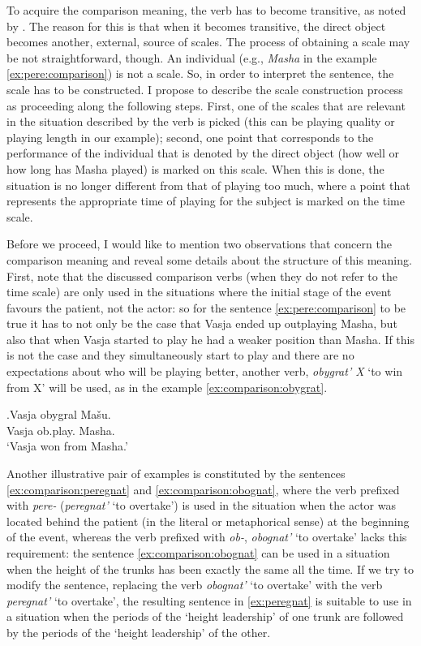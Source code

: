 To acquire the comparison meaning, the verb has to become transitive, as noted by \citet{Shvedova:82}. The reason for this is that when it becomes transitive, the direct object becomes another, external, source of scales. The process of obtaining a scale may be not straightforward, though. An individual (e.g., \textit{Masha} in the example \ref{ex:pere:comparison}) is not a scale. So, in order to interpret the sentence, the scale has to be constructed. I propose to describe the scale construction process as proceeding along the following steps. First, one of the scales that are relevant in the situation described by the verb is picked (this can be playing quality or playing length in our example); second, one point that corresponds to the performance of the individual that is denoted by the direct object (how well or how long has Masha played) is marked on this scale. When this is done, the situation is no longer different from that of playing too much, where a point that represents the appropriate time of playing for the subject is marked on the time scale.

Before we proceed, I would like to mention two observations that concern the comparison meaning and reveal some details about the structure of this meaning. First, note that the discussed comparison verbs (when they do not refer to the time scale) are only used in the situations where the initial stage of the event favours the patient, not the actor: so for the sentence \ref{ex:pere:comparison} to be true it has to not only be the case that Vasja ended up outplaying Masha, but also that when Vasja started to play he had a weaker position than Masha. If this is not the case and they simultaneously start to play and there are no expectations about who will be playing better, another verb, \textit{obygrat' X} `to win from X' will be used, as in the example \ref{ex:comparison:obygrat}. 

\exg.\label{ex:comparison:obygrat}Vasja obygral Ma\v{s}u.\\
Vasja ob.play. Masha.\\
\trans `Vasja won from Masha.'

Another illustrative pair of examples is constituted by the sentences \ref{ex:comparison:peregnat} and \ref{ex:comparison:obognat}, where the verb prefixed with \textit{pere-} (\textit{peregnat'} `to overtake') is used in the situation when the actor was located behind the patient (in the literal or metaphorical sense) at the beginning of the event, whereas the verb prefixed with {\textit{ob-},} \textit{obognat'} `to overtake' lacks this requirement: the sentence \ref{ex:comparison:obognat} can be used in a situation when the height of the trunks has been exactly the same all the time. If we try to modify the sentence, replacing the verb \textit{obognat'} `to overtake' with the verb \textit{peregnat'} `to overtake', the resulting sentence in \ref{ex:peregnat} is suitable to use in a situation when the periods of the `height leadership' of one trunk are followed by the periods of the `height leadership' of the other.

